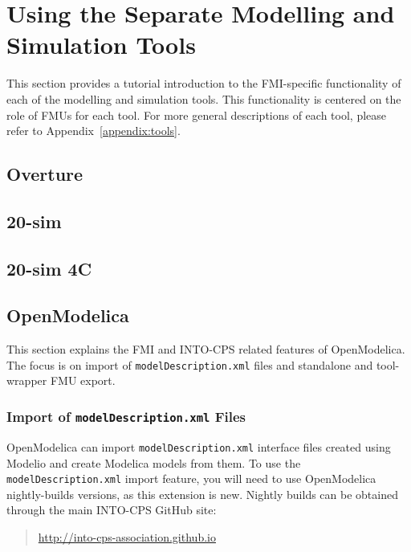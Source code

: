 
\section{Using the Separate Modelling and Simulation Tools}\label{sec:simulators}
This section provides a tutorial introduction to the FMI-specific functionality of each of the modelling and simulation tools.
%
This functionality is centered on the role of FMUs for each tool.
%
For more general descriptions of each tool, please refer to Appendix~\ref{appendix:tools}.
%
%
%
\subsection{Overture}
\label{sec:simulators:overture}


%
%
%
\subsection{20-sim}\label{sec:simulators:20sim}


%
%
%
\subsection{20-sim 4C}\label{sec:simulators:20sim4C}


%
%
%
\subsection{OpenModelica}
This section explains the FMI and INTO-CPS related features of OpenModelica.
%
The focus is on import of \texttt{model\allowbreak{}Description.\allowbreak{}xml} files and standalone and tool-wrapper FMU export.
%
%
%
\subsubsection{Import of \texttt{modelDescription.xml} Files}\label{sec:simulators:openmodelica:modeldescriptionimport}
OpenModelica can import \texttt{modelDescription\allowbreak{}.xml} interface files created using Modelio and create Modelica models from them.
%
To use the \texttt{modelDescription\allowbreak{}.xml} import feature, you will need to use OpenModelica nightly-builds versions, as this extension is new.
%
Nightly builds can be obtained through the main INTO-CPS GitHub site:
%
%
%
\begin{quote}
\url{http://into-cps-association.github.io}
\end{quote}
%
%
%

